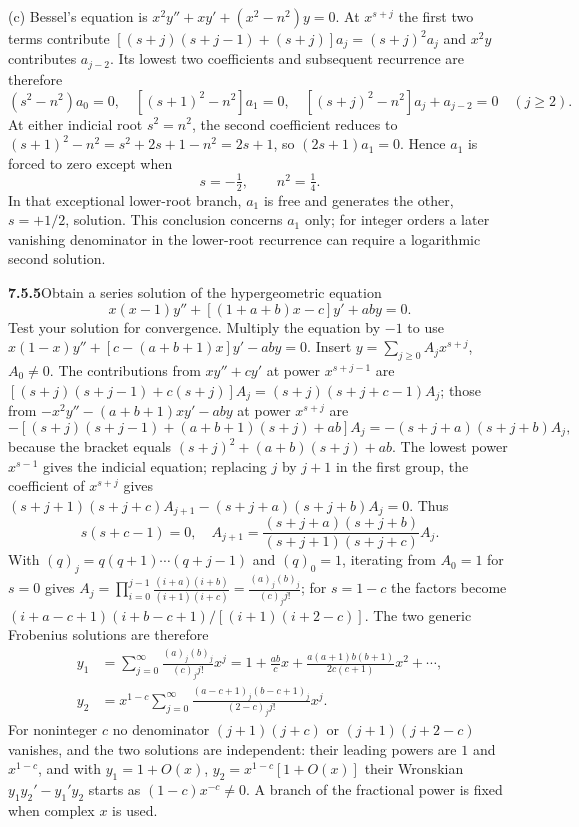 (c) Bessel's equation is $x^2y''+xy'+(x^2-n^2)y=0$. At $x^{s+j}$ the
first two terms contribute $[(s+j)(s+j-1)+(s+j)]a_j=(s+j)^2a_j$ and
$x^2y$ contributes $a_{j-2}$. Its lowest two
coefficients and subsequent recurrence are therefore
\[
(s^2-n^2)a_0=0,\quad [(s+1)^2-n^2]a_1=0,\quad
[(s+j)^2-n^2]a_j+a_{j-2}=0\quad(j\ge2).
\]
At either indicial root $s^2=n^2$, the second coefficient reduces to
$(s+1)^2-n^2=s^2+2s+1-n^2=2s+1$, so $(2s+1)a_1=0$. Hence $a_1$ is
forced to zero except when
\[
\boxed{s=-\tfrac12,\qquad n^2=\tfrac14}.
\]
In that exceptional lower-root branch, $a_1$ is free and generates the
other, $s=+1/2$, solution. This conclusion concerns $a_1$ only; for
integer orders a later vanishing denominator in the lower-root recurrence
can require a logarithmic second solution.

\par\bigskip
\noindent\textbf{7.5.5}\quad Obtain a series solution of the hypergeometric
equation
\[
x(x-1)y''+[(1+a+b)x-c]y'+aby=0.
\]
Test your solution for convergence.
\solution
Multiply the equation by $-1$ to use
$x(1-x)y''+[c-(a+b+1)x]y'-aby=0$.
Insert $y=\sum_{j\ge0}A_jx^{s+j}$, $A_0\ne0$. The contributions from
$x y''+c y'$ at power $x^{s+j-1}$ are
$[(s+j)(s+j-1)+c(s+j)]A_j=(s+j)(s+j+c-1)A_j$; those from
$-x^2y''-(a+b+1)xy'-aby$ at power $x^{s+j}$ are
\[
-[(s+j)(s+j-1)+(a+b+1)(s+j)+ab]A_j=-(s+j+a)(s+j+b)A_j,
\]
because the bracket equals $(s+j)^2+(a+b)(s+j)+ab$. The lowest power
$x^{s-1}$ gives the indicial equation; replacing $j$ by $j+1$ in the
first group, the coefficient of $x^{s+j}$ gives
$(s+j+1)(s+j+c)A_{j+1}-(s+j+a)(s+j+b)A_j=0$. Thus
\[
s(s+c-1)=0,
\quad
\boxed{A_{j+1}=\frac{(s+j+a)(s+j+b)}{(s+j+1)(s+j+c)}A_j}.
\]
With $(q)_j=q(q+1)\cdots(q+j-1)$ and $(q)_0=1$, iterating from $A_0=1$
for $s=0$ gives
$A_j=\prod_{i=0}^{j-1}\frac{(i+a)(i+b)}{(i+1)(i+c)}=\frac{(a)_j(b)_j}{(c)_jj!}$;
for $s=1-c$ the factors become $(i+a-c+1)(i+b-c+1)/[(i+1)(i+2-c)]$.
The two generic Frobenius solutions are therefore
\begin{align*}
y_1&=\sum_{j=0}^\infty\frac{(a)_j(b)_j}{(c)_j j!}x^j
=1+\frac{ab}{c}x+\frac{a(a+1)b(b+1)}{2c(c+1)}x^2+\cdots,\\
y_2&=x^{1-c}\sum_{j=0}^\infty
\frac{(a-c+1)_j(b-c+1)_j}{(2-c)_j j!}x^j.
\end{align*}
For noninteger $c$ no denominator $(j+1)(j+c)$ or $(j+1)(j+2-c)$
vanishes, and the two solutions are independent: their leading powers are
$1$ and $x^{1-c}$, and with $y_1=1+O(x)$, $y_2=x^{1-c}[1+O(x)]$ their
Wronskian $y_1y_2'-y_1'y_2$ starts as $(1-c)x^{-c}\ne0$.
A branch of the fractional power is fixed when complex $x$ is used.

